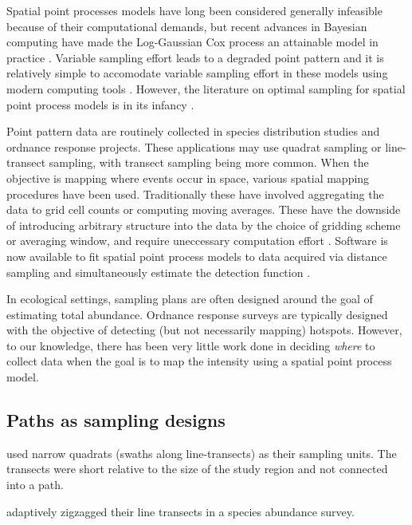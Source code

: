 \documentclass[review]{elsarticle}
\begin{document}
Spatial point processes models have long been considered generally infeasible
because of their computational demands, but recent advances in Bayesian
computing have made the Log-Gaussian Cox process an attainable model in
practice \citep{rueetal, lindgrenetal, illianetal, simpsonetal}. Variable
sampling effort leads to a degraded point pattern \cite{chakrabortyetal} and
it is relatively simple to accomodate variable sampling effort in these models
using modern computing tools \citep{yuanetal}. However, the literature on
optimal sampling for spatial point process models is in its infancy
\citep{liuvanhatalo}.

Point pattern data are routinely collected in species distribution studies and
ordnance response projects. These applications may use quadrat sampling or
line-transect sampling, with transect sampling being more common. When the
objective is mapping where events occur in space, various spatial mapping
procedures have been used. Traditionally these have involved aggregating the
data to grid cell counts or computing moving averages. These have the downside
of introducing arbitrary structure into the data by the choice of gridding
scheme or averaging window, and require uneccessary computation effort
\citep{simpsonetal}. Software is now available to fit spatial point process
models to data acquired via distance sampling and simultaneously estimate the
detection function \citep{dspat}.

In ecological settings, sampling plans are often designed around the goal of
estimating total abundance. Ordnance response surveys are typically designed
with the objective of detecting (but not necessarily mapping) hotspots.
However, to our knowledge, there has been very little work done in deciding
\emph{where} to collect data when the goal is to map the intensity using a
spatial point process model.

\subsection{Paths as sampling designs}

\citet{liuvanhatalo} used narrow quadrats (swaths along line-transects) as
their sampling units. The transects were short relative to the size of the
study region and not connected into a path.

\citet{pollard} adaptively zigzagged their line transects in a species
abundance survey.
\end{document}
